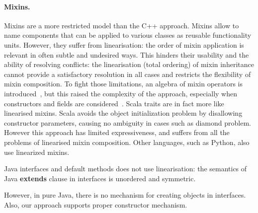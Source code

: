 \paragraph{Mixins.}
Mixins are a more restricted model than the C++ approach. Mixins allow to name
components that can be applied to various classes as reusable functionality
units. However, they suffer from linearisation: the order of mixin application
is relevant in often subtle and undesired ways. This hinders their usability
and the ability of resolving conflicts: the linearisation (total ordering) of
mixin inheritance cannot provide a satisfactory resolution in all cases and
restricts the flexibility of mixin composition. To fight those limitations, an
algebra of mixin operators is introduced~\cite{ancona2002calculus}, but this
raised the complexity of the approach, especially when constructors and fields
are considered~\cite{marco09FJigsaw}. Scala traits are in fact more like linearised mixins.
Scala avoids the object initialization
problem by disallowing constructor parameters, causing no ambiguity in cases
such as diamond problem. However this approach has limited expressiveness, and
suffers from all the problems of linearised mixin composition. Other languages, such as 
Python, also use linearized mixins.
\begin{comment}
Python also offers multiple inheritance via linearised mixins. Indeed in python any class is implicitly a mixin, and mixin composition informally expressed as\\*
\Q@ class A use B,C {...new methods...}@\\*
can be expressed in python as \\*
\Q@ class Aux: ...new methods...@\\*
\Q@ class A(B,C,Aux): pass@ 
\end{comment}
\noindent Java interfaces and default methods does not use
linearisation: the semantics of Java \textbf{extends} clause in
interfaces is unordered and symmetric.

However, in pure Java, there is no mechanism for creating objects in
interfaces. Also, our approach supports proper constructor mechanism.

